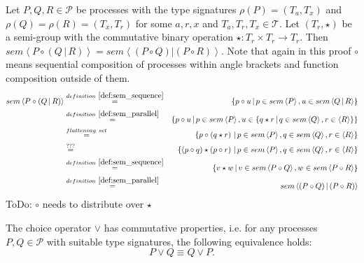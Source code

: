 \begin{myproof}
Let $P, Q, R \in \mathcal{P}$ be processes with the type signatures $\rho \left( P \right) = \left( T_a, T_x \right)$ and $\rho \left( Q \right) = \rho \left( R \right) = \left( T_x, T_r \right)$ for some $a, r, x$ and $T_a, T_r, T_x \in \mathcal{T}$. Let $\left( T_r, \star \right)$ be a semi-group with the commutative binary operation $\star \colon T_r \times T_r \to T_r$. Then $sem \left\langle P \circ \left( Q \,|\, R \right) \right\rangle = sem \left\langle \left( P \circ Q \right) | \left( P \circ R \right) \right\rangle$. Note that again in this proof $\circ$ means sequential composition of processes within angle brackets and function composition outside of them.
\begin{eqnarray*}
  sem \left\langle P \circ \left( Q \,|\, R \right) \right\rangle & \overset{\defref{def:sem_sequence}}{=} & \left\{ p \circ u \,|\, p \in sem \left\langle P \right\rangle, u \in sem \left\langle Q \,|\, R \right\rangle \right\} \\
  & \overset{\defref{def:sem_parallel}}{=} & \left\{ p \circ u \,|\, p \in sem \left\langle P \right\rangle, u \in \left\{q \star r \,|\, q \in sem \left\langle Q \right\rangle, r \in \left\langle R \right\rangle \right\} \right\} \\
  & \overset{flattening \ set}{=} & \left\{ p \circ \left( q \star r \right) \,|\, p \in sem \left\langle P \right\rangle, q \in sem \left\langle Q \right\rangle, r \in \left\langle R \right\rangle \right\} \\
  & \overset{???}{=} & \left\{ \left( p \circ q \right) \star \left( p \circ r \right) \,|\, p \in sem \left\langle P \right\rangle, q \in sem \left\langle Q \right\rangle, r \in \left\langle R \right\rangle \right\} \\
  & \overset{\defref{def:sem_sequence}}{=} & \left\{ v \star w \,|\, v \in sem \left\langle P \circ Q \right\rangle, w \in sem \left\langle P \circ R \right\rangle \right\} \\
  & \overset{\defref{def:sem_parallel}}{=} & sem \left\langle \left( P \circ Q \right) | \left( P \circ R \right) \right\rangle
\end{eqnarray*}
ToDo: $\circ$ needs to distribute over $\star$
\end{myproof}

\begin{theorem}
\label{thm:commutativity_choice}
The choice operator $\vee$ has commutative properties, i.e. for any processes $P, Q \in \mathcal{P}$ with suitable type signatures, the following equivalence holds:
\begin{equation*}
  P \vee Q \equiv Q \vee P.
\end{equation*}
\end{theorem}

